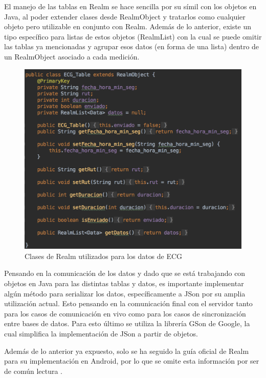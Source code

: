 El manejo de las tablas en Realm se hace sencilla por su símil con los objetos en Java, al poder extender clases desde RealmObject y tratarlos como cualquier objeto pero utilizable en conjunto con Realm. Además de lo anterior, existe un tipo específico para listas de estos objetos (RealmList) con la cual se puede omitir las tablas ya mencionadas y agrupar esos datos (en forma de una lista) dentro de un RealmObject asociado a cada medición.

\begin{figure}[H]
	\centering
	\includegraphics[scale=0.6]{figuras/protof/realmobject.png}
	\caption{Clases de Realm utilizados para los datos de ECG}
	\label{realm_ecg}
\end{figure}

Pensando en la comunicación de los datos y dado que se está trabajando con objetos en Java para las distintas tablas y datos, es importante implementar algún método para serializar los datos, específicamente a JSon por su amplia utilización actual. Esto pensando en la comunicación final con el servidor tanto para los casos de comunicación en vivo como para los casos de sincronización entre bases de datos. Para esto último se utiliza la librería GSon de Google, la cual simplifica la implementación de JSon a partir de objetos.

Además de lo anterior ya expuesto, solo se ha seguido la guía oficial de Realm para su implementación en Android, por lo que se omite esta información por ser de común lectura \cite{realm_android}.


